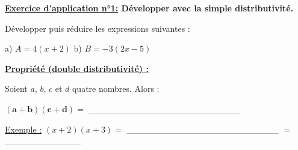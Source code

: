 \documentclass[12pt]{article}
\begin{document}
\vspace{10pt}
\begin{mdframed}[
    linewidth=1pt,
    roundcorner=5pt,
    linecolor=RoyalBlue,
    innertopmargin=10pt,
    innerbottommargin=10pt
]
{\color{RoyalBlue}
\textbf{\underline{Exercice d'application n°1:} Développer avec la simple distributivité.}}

\vspace{5pt}
Développer puis réduire les expressions suivantes :

\vspace{5pt}
\hspace{1cm}a) $A = 4(x+2)$ \hspace{3cm}b) $B = -3(2x-5)$

\vspace{0.5cm}
{\color{black!45}\dotfill}

\vspace{0.5cm}
{\color{black!45}\dotfill}

\vspace{0.5cm}
{\color{black!45}\dotfill}

\vspace{0.5cm}
{\color{black!45}\dotfill}

\vspace{20pt}

\end{mdframed}

\begin{mdframed}[
    linewidth=1pt,
    roundcorner=5pt,
    linecolor=Red,
    innertopmargin=10pt,
    innerbottommargin=10pt
]
{\color{red}
\textbf{\underline{Propriété (double distributivité) :}}

\vspace{5pt}
Soient $a$, $b$, $c$ et $d$ quatre nombres. Alors :

\vspace{10pt}
\begin{center}
    $\bm{(a+b)(c+d) = }$ \_\_\_\_\_\_\_\_\_\_\_\_\_\_\_\_\_\_\_\_\_\_\_\_
\end{center}
}
\end{mdframed}

\vspace{5pt}
\underline{Exemple :} $(x+2)(x+3) = $ \_\_\_\_\_\_\_\_\_\_\_\_\_\_\_\_\_\_\_\_\_\_\_\_ $=$ \_\_\_\_\_\_\_\_\_\_\_\_
\end{document}
